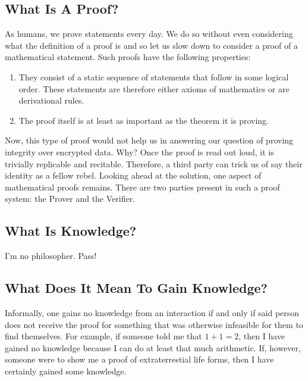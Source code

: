 \documentclass{article}
\begin{document}
\subsection{What Is A Proof?}
As humans, we prove statements every day. We do so without even considering what the definition of a proof is and so let us slow down to consider a proof of a mathematical statement. Such proofs have the following properties:
\begin{enumerate}
    \item They consist of a static sequence of statements that follow in some logical order. These statements are therefore either axioms of mathematics or are derivational rules.
    \item The proof itself is at least as important as the theorem it is proving.
\end{enumerate}
Now, this type of proof would not help us in answering our question of proving integrity over encrypted data. Why? Once the proof is read out loud, it is trivially replicable and recitable. Therefore, a third party can trick us of say their identity as a fellow rebel. Looking ahead at the solution, one aspect of mathematical proofs remains. There are two parties present in such a proof system: the Prover and the Verifier.
\subsection{What Is Knowledge?}
I'm no philosopher. Pass!
\subsection{What Does It Mean To Gain Knowledge?}
Informally, one gains no knowledge from an interaction if and only if said person does not receive the proof for something that was otherwise infeasible for them to find themselves. For example, if someone told me that $1 + 1 = 2$, then I have gained no knowledge because I can do at least that much arithmetic. If, however, someone were to show me a proof of extraterrestial life forms, then I have certainly gained some knowledge.
\end{document}
